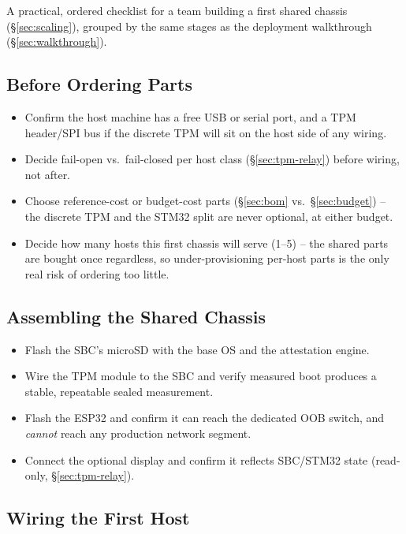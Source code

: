 \documentclass[11pt,a4paper]{article}
\begin{document}
A practical, ordered checklist for a team building a first shared
chassis (\S\ref{sec:scaling}), grouped by the same stages as the
deployment walkthrough (\S\ref{sec:walkthrough}).

\subsection{Before Ordering Parts}

\begin{itemize}[label=$\square$]
  \item Confirm the host machine has a free USB or serial port, and a
    TPM header/SPI bus if the discrete TPM will sit on the host side of
    any wiring.
  \item Decide fail-open vs.\ fail-closed per host class
    (\S\ref{sec:tpm-relay}) before wiring, not after.
  \item Choose reference-cost or budget-cost parts (\S\ref{sec:bom}
    vs.\ \S\ref{sec:budget}) -- the discrete TPM and the STM32 split
    are never optional, at either budget.
  \item Decide how many hosts this first chassis will serve (1--5) --
    the shared parts are bought once regardless, so under-provisioning
    per-host parts is the only real risk of ordering too little.
\end{itemize}

\subsection{Assembling the Shared Chassis}

\begin{itemize}[label=$\square$]
  \item Flash the SBC's microSD with the base OS and the attestation
    engine.
  \item Wire the TPM module to the SBC and verify measured boot
    produces a stable, repeatable sealed measurement.
  \item Flash the ESP32 and confirm it can reach the dedicated OOB
    switch, and \emph{cannot} reach any production network segment.
  \item Connect the optional display and confirm it reflects SBC/STM32
    state (read-only, \S\ref{sec:tpm-relay}).
\end{itemize}

\subsection{Wiring the First Host}
\end{document}
